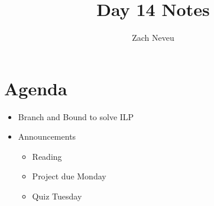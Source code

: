 \documentclass[12pt, letter]{article}
\author{Zach Neveu}
\title{ Day 14 Notes }
\begin{document}
\maketitle

\section{Agenda}%
\label{sec:agenda}
\begin{itemize}
	\item Branch and Bound to solve ILP
	\item Announcements
	\begin{itemize}
		\item Reading
		\item Project due Monday
		\item Quiz Tuesday
	\end{itemize}
\end{itemize}
\end{document}
